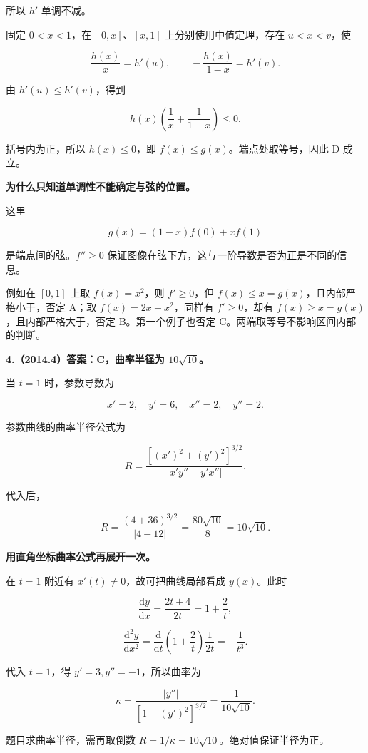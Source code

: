 \documentclass[UTF8,11pt,fontset=windows]{ctexart}
\begin{document}
所以 $h'$ 单调不减。

固定 $0<x<1$，在 $[0,x]$、$[x,1]$ 上分别使用中值定理，存在 $u<x<v$，使

$$
\frac{h(x)}x=h'(u),
\qquad -\frac{h(x)}{1-x}=h'(v).
$$

由 $h'(u)\le h'(v)$，得到

$$
h(x)\left(\frac1x+\frac1{1-x}\right)\le0.
$$

括号内为正，所以 $h(x)\le0$，即 $f(x)\le g(x)$。端点处取等号，因此 D 成立。

\textbf{为什么只知道单调性不能确定与弦的位置。}

这里

$$
g(x)=(1-x)f(0)+xf(1)
$$

是端点间的弦。$f''\ge0$ 保证图像在弦下方，这与一阶导数是否为正是不同的信息。

例如在 $[0,1]$ 上取 $f(x)=x^2$，则 $f'\ge0$，但 $f(x)\le x=g(x)$，且内部严格小于，否定 A；取 $f(x)=2x-x^2$，同样有 $f'\ge0$，却有 $f(x)\ge x=g(x)$，且内部严格大于，否定 B。第一个例子也否定 C。两端取等号不影响区间内部的判断。

\clearpage

\textbf{4.（2014.4）答案：C，曲率半径为 $10\sqrt{10}$。}

当 $t=1$ 时，参数导数为

$$
x'=2,\quad y'=6,\quad x''=2,\quad y''=2.
$$

参数曲线的曲率半径公式为

$$
R=\frac{[(x')^2+(y')^2]^{3/2}}{|x'y''-y'x''|}.
$$

代入后，

$$
R=\frac{(4+36)^{3/2}}{|4-12|}
=\frac{80\sqrt{10}}8=10\sqrt{10}.
$$

\textbf{用直角坐标曲率公式再展开一次。}

在 $t=1$ 附近有 $x'(t)\ne0$，故可把曲线局部看成 $y(x)$。此时

$$
\frac{\mathrm dy}{\mathrm dx}
=\frac{2t+4}{2t}=1+\frac2t,
$$

$$
\frac{\mathrm d^2y}{\mathrm dx^2}
=\frac{\mathrm d}{\mathrm dt}\left(1+\frac2t\right)\frac1{2t}
=-\frac1{t^3}.
$$

代入 $t=1$，得 $y'=3,y''=-1$，所以曲率为

$$
\kappa=\frac{|y''|}{[1+(y')^2]^{3/2}}
=\frac1{10\sqrt{10}}.
$$

题目求曲率半径，需再取倒数 $R=1/\kappa=10\sqrt{10}$。绝对值保证半径为正。

\clearpage
\end{document}
